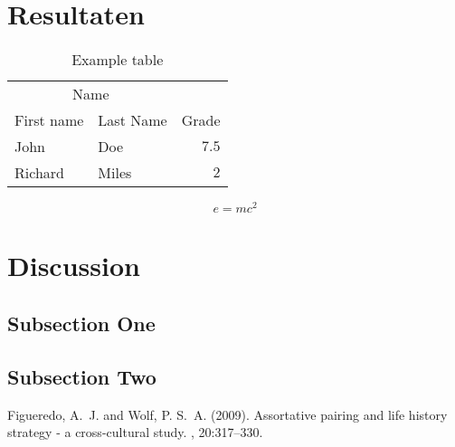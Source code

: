 \documentclass[twoside]{article}
\begin{document}
\begin{multicols}{2}
\begin{compactitem}
\end{compactitem}



\section{Resultaten}

\begin{table}[H]
\caption{Example table}
\centering
\begin{tabular}{llr}
\toprule
\multicolumn{2}{c}{Name} \\
\cmidrule(r){1-2}
First name & Last Name & Grade \\
\midrule
John & Doe & $7.5$ \\
Richard & Miles & $2$ \\
\bottomrule
\end{tabular}
\end{table}

\lipsum[5] %

\begin{equation}
\label{eq:emc}
e = mc^2
\end{equation}

\lipsum[6] %


\section{Discussion}

\subsection{Subsection One}

\lipsum[7] %

\subsection{Subsection Two}

\lipsum[8] %


\begin{thebibliography}{99} %

Figueredo, A.~J. and Wolf, P. S.~A. (2009).
\newblock Assortative pairing and life history strategy - a cross-cultural
  study.
, 20:317--330.
 
\end{thebibliography}


\end{multicols}
\end{document}
